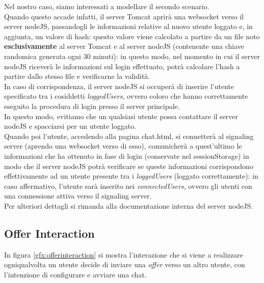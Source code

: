 Nel nostro caso, siamo interessati a modellare il secondo scenario.\\
Quando questo accade infatti, il server Tomcat aprirà una websocket verso il server nodeJS, passandogli le informazioni relative al nuovo utente loggato e, in aggiunta, un valore di hash: questo valore viene calcolato a partire da un file noto \textbf{esclusivamente} al server Tomcat e al server nodeJS (contenente una chiave randomica generata ogni 30 minuti): in questo modo, nel momento in cui il server nodeJS riceverà le informazioni sul login effettuato, potrà calcolare l'hash a partire dallo stesso file e verificarne la validità.\\
In caso di corrispondenza, il server nodeJS si occuperà di inserire l'utente specificato tra i cosiddetti \textit{loggedUsers}, ovvero coloro che hanno correttamente eseguito la procedura di login presso il server principale.\\
In questo modo, evitiamo che un qualsiasi utente possa contattare il server nodeJS e spacciarsi per un utente loggato.\\
Quando poi l'utente, accedendo alla pagina chat.html, si connetterà al signaling server (aprendo una websocket verso di esso), comunicherà a quest'ultimo le informazioni che ha ottenuto in fase di login (conservate nel sessionStorage) in modo che il server nodeJS potrà verificare se queste informazioni corrispondono effettivamente ad un utente presente tra i \textit{loggedUsers} (loggato correttamente): in caso affermativo, l'utente sarà inserito nei \textit{connectedUsers}, ovvero gli utenti con una connessione attiva verso il signaling server.\\
Per ulteriori dettagli si rimanda alla documentazione interna del server nodeJS.\\



\subsection{Offer Interaction}

In figura \ref{gfx:offerinteraction} si mostra l'interazione che si viene a realizzare ogniqualvolta un utente decide di inviare una \textit{offer} verso un altro utente, con l'intenzione di configurare e avviare una chat.

